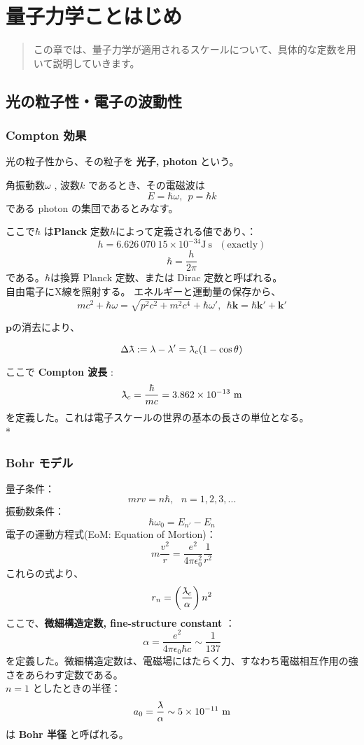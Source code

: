 \chapter{量子力学ことはじめ}
\begin{abstract}
	この章では、量子力学が適用されるスケールについて、具体的な定数を用いて説明していきます。
\end{abstract}

\section{光の粒子性・電子の波動性}

\subsection{Compton 効果}
光の粒子性から、その粒子を  \textbf{光子, photon}  という。

角振動数$\omega$ , 波数$k$ であるとき、その電磁波は
\[
	E = \hbar \omega,\ \ p = \hbar k
\]
である photon の集団であるとみなす。

ここで$\hbar$ は\textbf{Planck} 定数$h$によって定義される値であり、：
\[
	h = 6.626\ 070\ 15 \times 10^{-34} \mathrm{J\ s}\ \ \ (\mathrm{exactly})
\]
\[
	\hbar = \frac{h}{2\pi}
\]
である。$\hbar$は換算 Planck 定数、または Dirac 定数と呼ばれる。
\\

自由電子にX線を照射する。
エネルギーと運動量の保存から、
\[
	mc^2 + \hbar\omega = \sqrt{p^2c^2 + m^2c^4} + \hbar \omega',\ \ \hbar \bm{k} = \hbar \bm{k'} + \bm{k}'
\]

$\bm{p}$の消去により、

\[
	\Delta \lambdabar := \lambda - \lambda' = \lambdabar_c(1-\cos \theta)
\]

ここで \textbf{Compton 波長} :
\[
	\lambdabar_c = \frac{\hbar}{mc}  = 3.862 \times 10^{-13}\ \mathrm{m}
\]
を定義した。これは電子スケールの世界の基本の長さの単位となる。
\vspace{0.2in} \\*

\subsection{Bohr モデル}
量子条件：
\[
	mrv = n\hbar,\ \ \ n = 1,2,3,...
\]
振動数条件：
\[
	\hbar \omega_0 = E_{n'} - E_n
\]
電子の運動方程式(EoM: Equation of Mortion)：
\[
	m \frac{v^2}{r} = \frac{e^2}{4\pi \epsilon_0^2} \frac{1}{r^2}
\]
これらの式より、
\[
	r_n = \left( \frac{\lambdabar_c}{\alpha} \right) n^2
\]
ここで、\textbf{微細構造定数, fine-structure constant} ：
\[
	\alpha = \frac{e^2}{4\pi\epsilon_0 \hbar c} \sim \frac{1}{137}
\]
を定義した。微細構造定数は、電磁場にはたらく力、すなわち電磁相互作用の強さをあらわす定数である。\\
$n=1$ としたときの半径：
\[
	a_0 = \frac{\lambdabar}{\alpha} \sim 5 \times 10^{-11}\ \mathrm{m}
\]
は \textbf{Bohr 半径} と呼ばれる。

